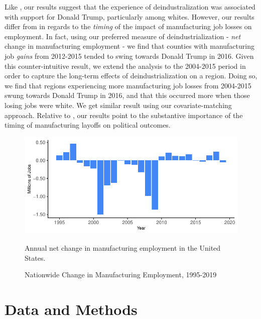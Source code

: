 \documentclass[]{AEA}
\begin{document}
Like \cite{Baccini21}, our results suggest that the experience of
deindustralization was associated with support for Donald Trump,
particularly among whites. However, our results differ from
\cite{Baccini21} in regards to the \emph{timing} of the impact of
manufacturing job losses on employment. In fact, using our preferred
measure of deindustrialization - \emph{net} change in manufacturing
employment - we find that counties with manufacturing job \emph{gains}
from 2012-2015 tended to swing towards Donald Trump in 2016. Given this
counter-intuitive result, we extend the analysis to the 2004-2015 period
in order to capture the long-term effects of deindustrialization on a
region. Doing so, we find that regions experiencing more manufacturing
job losses from 2004-2015 swung towards Donald Trump in 2016, and that
this occurred more when those losing jobs were white. We get similar
result using our covariate-matching approach. Relative to
\cite{Baccini21}, our results point to the substantive importance of the
timing of manufacturing layoffs on political outcomes.

\FloatBarrier
\begin{figure}
\caption{Nationwide Change in Manufacturing Employment, 1995-2019}
\label{natlPlotTS}

\begin{center}\includegraphics{Final-Draft_files/figure-latex/unnamed-chunk-3-1} \end{center}



\FloatBarrier
\begin{figurenotes}
Annual net change in manufacturing employment in the United States. 
\end{figurenotes}
\end{figure}
\FloatBarrier

\section{Data and Methods} 
\label{datamethods}
\end{document}
